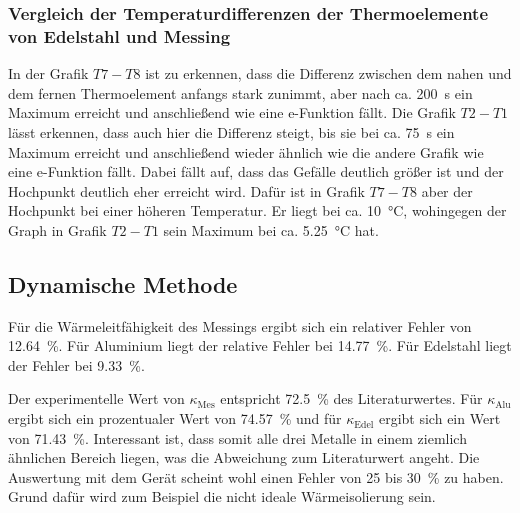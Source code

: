 \subsubsection{Vergleich der Temperaturdifferenzen der Thermoelemente von Edelstahl und Messing}
In der Grafik $T7-T8$ ist zu erkennen, dass die Differenz zwischen dem nahen und dem fernen Thermoelement anfangs stark zunimmt, aber nach ca. 
\SI{200}{\second} ein Maximum erreicht und anschließend wie eine e-Funktion fällt. Die Grafik $T2-T1$ lässt erkennen, dass auch hier die 
Differenz steigt, bis sie bei ca. \SI{75}{\second} ein Maximum erreicht und anschließend wieder ähnlich wie die andere Grafik wie eine 
e-Funktion fällt. Dabei fällt auf, dass das Gefälle deutlich größer ist und der Hochpunkt deutlich eher erreicht wird. Dafür ist in Grafik 
$T7-T8$ aber der Hochpunkt bei einer höheren Temperatur. Er liegt bei ca. \SI{10}{\degreeCelsius}, wohingegen der Graph in Grafik $T2-T1$ sein
Maximum bei ca. \SI{5.25}{\degreeCelsius} hat.

\subsection{Dynamische Methode}
Für die Wärmeleitfähigkeit des Messings ergibt sich ein relativer Fehler von \SI{12.64}{\percent}. Für Aluminium liegt der relative 
Fehler bei \SI{14.77}{\percent}. Für Edelstahl liegt der Fehler bei \SI{9.33}{\percent}. 

\noindent Der experimentelle Wert von $\kappa_\text{Mes}$ entspricht \SI{72.5}{\percent} des Literaturwertes. 
Für $\kappa_\text{Alu}$ ergibt sich ein prozentualer Wert von \SI{74.57}{\percent} und für $\kappa_\text{Edel}$ ergibt sich ein Wert 
von \SI{71.43}{\percent}. Interessant ist, dass somit alle drei Metalle in einem ziemlich ähnlichen Bereich liegen, was die Abweichung zum 
Literaturwert angeht. 
Die Auswertung mit dem Gerät scheint wohl einen Fehler von \num{25} bis \SI{30}{\percent} zu haben. Grund dafür wird zum Beispiel die 
nicht ideale Wärmeisolierung sein.